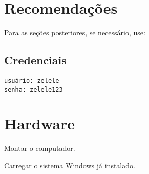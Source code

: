 


\siheader
\section*{Recomendações}
Para as seções posteriores, se necessário, use:

\subsection*{Credenciais}
\begin{verbatim}
usuário: zelele
senha: zelele123
\end{verbatim}

\section*{Hardware}
\begin{questions}

\question
Montar o computador.


\question
Carregar o sistema Windows já instalado.

\end{questions}
\newpage


